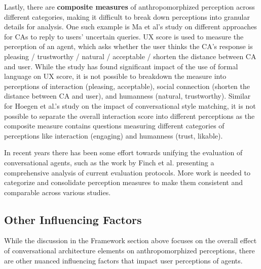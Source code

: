 \documentclass[sigconf,screen,review, anonymous]{acmart}
\newcommand{\cmt}[1]{}%
\begin{document}
Lastly, there are \textbf{composite measures} of anthropomorphized perception across different categories, making it difficult to break down perceptions into granular details for analysis. One such example is Ma et al's study \cite{ma2022ask}\cmt{[29]} on different approaches for CAs to reply to users' uncertain queries. UX score is used to measure the perception of an agent, which asks whether the user thinks the CA's response is pleasing / trustworthy / natural / acceptable / shorten the distance between CA and user. While the study has found significant impact of the use of formal language on UX score, it is not possible to breakdown the measure into perceptions of interaction (pleasing, acceptable), social connection (shorten the distance between CA and user), and humanness (natural, trustworthy). Similar for Hoegen et al.'s study \cite{hoegen2019end}\cmt{[31]} on the impact of conversational style matching, it is not possible to separate the overall interaction score into different perceptions as the composite measure contains questions measuring different categories of perceptions like interaction (engaging) and humanness (trust, likable).

In recent years there has been some effort towards unifying the evaluation of conversational agents, such as the work by Finch et al. \cite{finch2020towards} presenting a comprehensive analysis of current evaluation protocols. More work is needed to categorize and consolidate perception measures to make them consistent and comparable across various studies. 


\subsection{Other Influencing Factors}

While the discussion in the Framework section above focuses on the overall effect of conversational architecture elements on anthropomorphized perceptions,  there are other nuanced influencing factors that impact user perceptions of agents. 
\end{document}
